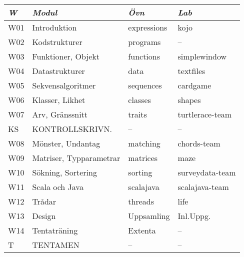 \begin{tabular}{l|l|l|l}
\textit{W} & \textit{Modul} & \textit{Övn} & \textit{Lab} \\ \hline \hline
W01 & Introduktion            & expressions & kojo            \\
W02 & Kodstrukturer           & programs    & --              \\
W03 & Funktioner, Objekt      & functions   & simplewindow    \\
W04 & Datastrukturer          & data        & textfiles       \\
W05 & Sekvensalgoritmer       & sequences   & cardgame        \\
W06 & Klasser, Likhet         & classes     & shapes          \\
W07 & Arv, Gränssnitt         & traits      & turtlerace-team \\
KS  & KONTROLLSKRIVN.         & --          & --              \\
W08 & Mönster, Undantag       & matching    & chords-team     \\
W09 & Matriser, Typparametrar & matrices    & maze            \\
W10 & Sökning, Sortering      & sorting     & surveydata-team \\
W11 & Scala och Java          & scalajava   & scalajava-team  \\
W12 & Trådar                  & threads     & life            \\
W13 & Design                  & Uppsamling  & Inl.Uppg.       \\
W14 & Tentaträning            & Extenta     & --              \\
T   & TENTAMEN                & --          & --              \\
\end{tabular}
